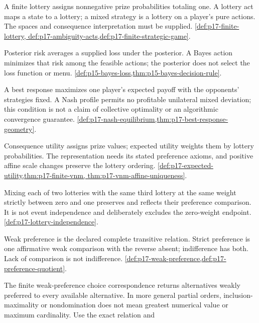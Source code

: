 \begin{description}[style=nextline,leftmargin=0pt]
\item[Act; lottery; mixed strategy.]
A finite lottery assigns nonnegative prize probabilities totaling one.
A lottery act maps a state to a lottery; a mixed strategy is a lottery
on a player's pure actions. The spaces and consequence interpretation
must be supplied. \cref{def:p17-finite-lottery,
def:p17-ambiguity-acts,def:p17-finite-strategic-game}.
\item[Bayes action; posterior risk; loss.]
Posterior risk averages a supplied loss under the posterior. A Bayes
action minimizes that risk among the feasible actions; the posterior
does not select the loss function or menu.
\cref{def:p15-bayes-loss,thm:p15-bayes-decision-rule}.
\item[Best response; Nash equilibrium.]
A best response maximizes one player's expected payoff with the opponents'
strategies fixed. A Nash profile permits no profitable unilateral mixed
deviation; this condition is not a claim of collective optimality or an
algorithmic convergence guarantee.
\cref{def:p17-nash-equilibrium,thm:p17-best-response-geometry}.
\item[Expected utility; consequence utility.]
Consequence utility assigns prize values; expected utility weights them
by lottery probabilities. The representation needs its stated preference
axioms, and positive affine scale changes preserve the lottery ordering.
\cref{def:p17-expected-utility,thm:p17-finite-vnm,
thm:p17-vnm-affine-uniqueness}.
\item[Independence axiom.]
Mixing each of two lotteries with the same third lottery at the same
weight strictly between zero and one preserves and reflects their preference
comparison. It is not event independence and deliberately excludes the
zero-weight endpoint. \cref{def:p17-lottery-independence}.
\item[Indifference; strict preference; weak preference.]
Weak preference is the declared complete transitive relation. Strict
preference is one affirmative weak comparison with the reverse absent;
indifference has both. Lack of comparison is not indifference.
\cref{def:p17-weak-preference,def:p17-preference-quotient}.
\item[Maximal choice; maximizer.]
The finite weak-preference choice correspondence returns alternatives
weakly preferred to every available alternative. In more general partial
orders, inclusion-maximality or nondomination does not mean greatest
numerical value or maximum cardinality. Use the exact relation and

\end{description}
